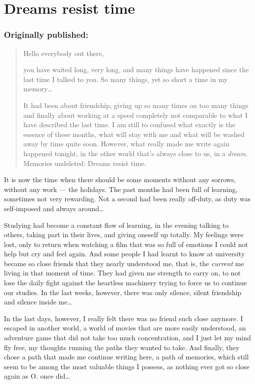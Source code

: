 \chapter{Dreams resist time}
\label{cha:dreams-resist-time}
\subsection*{Originally published: }
\begin{quote}
Hello everybody out there, 

you have waited long, very long, and many things have happened since the last time I talked to you. So many things, yet so short a time in my memory\ldots

It had been about friendship, giving up so many times on too many things and finally about working at a speed completely not comparable to what I have described the last time. I am still to confused what exactly is the essence of these months, what will stay with me and what will be washed away by time quite soon. However, what really made me write again happened tonight, in the other world that's always close to us, in a \emph{dream}. Memories undeleted: Dreams resist time.
\end{quote}

It is now the time when there should be some moments without any sorrows, without any work --- the holidays. The past months had been full of learning, sometimes not very rewarding. Not a second had been really off-duty, as duty was self-imposed and always around\ldots

Studying had become a constant flow of learning, in the evening talking to others, taking part in their lives, and giving oneself up totally. My feelings were lost, only to return when watching a film that was so full of emotions I could not help but cry and feel again. And some people I had learnt to know at university became so close friends that they nearly understood me, that is, the \emph{current} me living in that moment of time. They had given me strength to carry on, to not lose the daily fight against the heartless machinery trying to force us to continue our studies. In the last weeks, however, there was only silence, silent friendship and silence inside me\ldots

In the last days, however, I really felt there was no friend such close anymore. I escaped in another world, a world of movies that are more easily understood, an adventure game that did not take too much concentration, and I just let my mind fly free, my thoughts running the paths they wanted to take. And finally, they chose a path that made me continue writing here, a path of memories, which still seem to be among the most valuable things I possess, as nothing ever got so close again as O. once did\ldots

